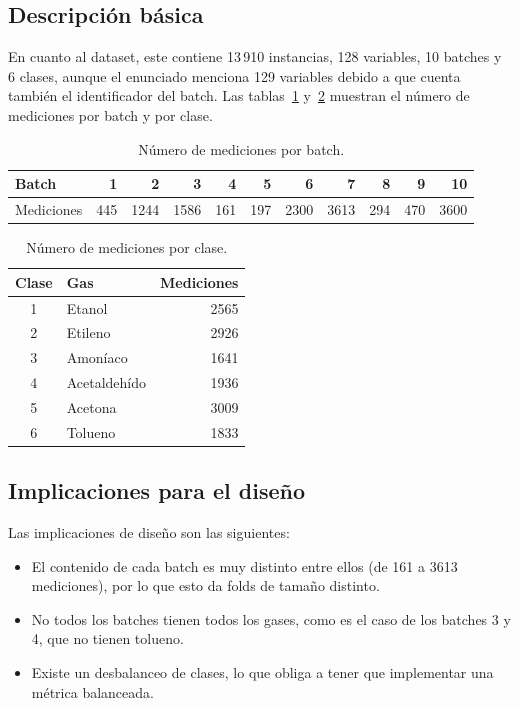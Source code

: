 \subsection{Descripción básica}

En cuanto al dataset, este contiene 13\,910 instancias, 128 variables, 10 batches y 6 clases,
aunque el enunciado menciona 129 variables debido a que cuenta también el identificador del batch.
Las tablas~\ref{tab:filasBatch} y~\ref{tab:filasClase} muestran el número de mediciones por batch
y por clase.

\begin{table}[H]
\centering
\caption{Número de mediciones por batch.}
\label{tab:filasBatch}
\begin{tabular}{lrrrrrrrrrr}
\toprule
Batch      & 1   & 2    & 3    & 4   & 5   & 6    & 7    & 8   & 9   & 10   \\
\midrule
Mediciones & 445 & 1244 & 1586 & 161 & 197 & 2300 & 3613 & 294 & 470 & 3600 \\
\bottomrule
\end{tabular}
\end{table}

\begin{table}[H]
\centering
\caption{Número de mediciones por clase.}
\label{tab:filasClase}
\begin{tabular}{clr}
\toprule
Clase & Gas          & Mediciones \\
\midrule
1     & Etanol       & 2565 \\
2     & Etileno      & 2926 \\
3     & Amoníaco     & 1641 \\
4     & Acetaldehído & 1936 \\
5     & Acetona      & 3009 \\
6     & Tolueno      & 1833 \\
\bottomrule
\end{tabular}
\end{table}

\subsection{Implicaciones para el diseño}

Las implicaciones de diseño son las siguientes:
\begin{itemize}
  \item El contenido de cada batch es muy distinto entre ellos (de 161 a 3613 mediciones), por lo
        que esto da folds de tamaño distinto.
  \item No todos los batches tienen todos los gases, como es el caso de los batches 3 y 4, que no
        tienen tolueno.
  \item Existe un desbalanceo de clases, lo que obliga a tener que implementar una métrica
        balanceada.
\end{itemize}